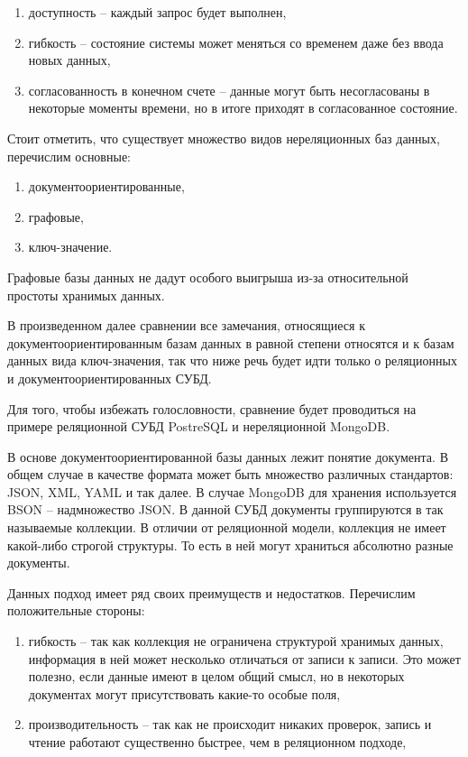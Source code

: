 \begin{enumerate}
	\item доступность -- каждый запрос будет выполнен,
	\item гибкость -- состояние системы может меняться со временем даже без ввода новых данных,
	\item согласованность в конечном счете -- данные могут быть несогласованы в некоторые
	      моменты времени, но в итоге приходят в согласованное состояние.
\end{enumerate}

Стоит отметить, что существует множество видов нереляционных баз данных, перечислим
основные:

\begin{enumerate}
	\item документоориентированные,
	\item графовые,
	\item ключ-значение.
\end{enumerate}

Графовые базы данных не дадут особого выигрыша из-за относительной простоты хранимых данных.

В произведенном далее сравнении все замечания, относящиеся к документоориентированным базам данных
в равной степени относятся и к базам данных вида ключ-значения, так что ниже речь будет идти
только о реляционных и документоориентированных СУБД.

Для того, чтобы избежать голословности, сравнение будет проводиться на примере реляционной СУБД PostreSQL и 
нереляционной MongoDB.

В основе документоориентированной базы данных лежит понятие документа. В общем случае в качестве формата
может быть множество различных стандартов: JSON, XML, YAML и так далее. В случае MongoDB для хранения
используется BSON -- надмножество JSON. В данной СУБД документы группируются в так называемые
коллекции. В отличии от реляционной модели, коллекция не имеет какой-либо строгой структуры. То есть
в ней могут храниться абсолютно разные документы.

Данных подход имеет ряд своих преимуществ и недостатков. Перечислим положительные стороны:

\begin{enumerate}
	\item гибкость -- так как коллекция не ограничена структурой хранимых данных, информация
	      в ней может несколько отличаться от записи к записи. Это может полезно, если
	      данные имеют в целом общий смысл, но в некоторых документах могут присутствовать
	      какие-то особые поля,
	\item производительность -- так как не происходит никаких проверок, запись и чтение
	      работают существенно быстрее, чем в реляционном подходе,
\end{enumerate}

